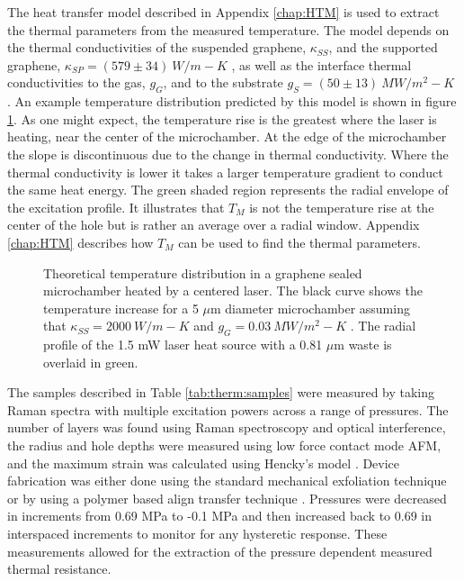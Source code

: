 The heat transfer model described in Appendix \ref{chap:HTM} is used to extract the thermal parameters from the measured temperature.
The model depends on the thermal conductivities of the suspended graphene, $\kappa_{SS}$, and the supported graphene, $\kappa_{SP}=(579 \pm 34) \ W/m-K$ \cite{Seol2010}, as well as the interface thermal conductivities to the gas, $g_G$, and to the substrate $g_S=(50 \pm 13) \ MW/m^2-K$ \cite{Mak2010}.
An example temperature distribution predicted by this model is shown in figure \ref{fig:therm:HTPlot}.
As one might expect, the temperature rise is the greatest where the laser is heating, near the center of the microchamber.
At the edge of the microchamber the slope is discontinuous due to the change in thermal conductivity.
Where the thermal conductivity is lower it takes a larger temperature gradient to conduct the same heat energy.
The green shaded region represents the radial envelope of the excitation profile.
It illustrates that $T_M$ is not the temperature rise at the center of the hole but is rather an average over a radial window.
Appendix \ref{chap:HTM} describes how $T_M$ can be used to find the thermal parameters.

\begin{figure}
	\begin{center}
	
	\end{center}
	\caption[Expected temperature distribution in a graphene sealed microchamber heated by a centered laser]
	{\label{fig:therm:HTPlot}
		Theoretical temperature distribution in a graphene sealed microchamber heated by a centered laser.
		The black curve shows the temperature increase for a 5 $\mu$m diameter microchamber assuming that $\kappa_{SS}=2000 \ W/m-K$ and  $g_{G}=0.03 \ MW/m^2-K$ \cite{Chen2011a}.
		The radial profile of the 1.5 mW laser heat source with a 0.81 $\mu$m waste is overlaid in green.
	}
\end{figure}

The samples described in Table \ref{tab:therm:samples} were measured by taking Raman spectra with multiple excitation powers across a range of pressures.
The number of layers was found using Raman spectroscopy and optical interference, the radius and hole depths were measured using low force contact mode AFM, and the maximum strain was calculated using Hencky's model \cite{Hencky1915}.
Device fabrication was either done using the standard mechanical exfoliation technique or by using a polymer based align transfer technique \cite{Goossens2013T}.
Pressures were decreased in increments from 0.69 MPa to -0.1 MPa and then increased back to 0.69 in interspaced increments to monitor for any hysteretic response.
These measurements allowed for the extraction of the pressure dependent measured thermal resistance.

